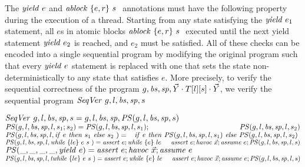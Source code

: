 The $\mathit{yield}\ e$ and $\mathit{ablock}\ {\{e,r\}}\ {s}\ $ annotations must have the following property during the execution of a thread. Starting from any state satisfying the $\mathit{yield}\ e_1$ statement, all $e$s in atomic blocks $\mathit{ablock}\ {\{e,r\}}\ {s}\ $ executed until the next yield statement $\mathit{yield}\ e_2$ is reached, and $e_2$ must be satisfied. All of these checks can be encoded into a single sequential program by modifying the original program such that every $\mathit{yield}\ e$ statement is replaced with one that sets the state non-deterministically to any state that satisfies $e$. More precisely, to verify the sequential correctness of the program $g, \mathit{bs}, \mathit{sp}, \vec{Y} \cdot T[l][s] \cdot \vec{Y}$, we verify the sequential program ${\mathit{SeqVer}\ } g, l, \mathit{bs}, \mathit{sp}, s$

\noindent
${\mathit{SeqVer}\ } g, l, \mathit{bs}, \mathit{sp}, s = g, l, \mathit{bs}, \mathit{sp},
                                                                         \mathit{PS}(g, l, \mathit{bs}, \mathit{sp},s)$\\
$\SeqProcStmt(\varsG, \varsL, \bodies, \specs, l, s_1; s_2) =  \SeqProcStmt(\varsG, \varsL, \bodies, \specs, l, s_1); \\
                                                                                      \hspace*{4.3cm}   \SeqProcStmt(\varsG, \varsL, \bodies, \specs, l, s_2)$\\
$\mathit{PS}(g, l, \mathit{bs}, \mathit{sp}, l, {\mathit{if}\ {e}\ }{\mathit{then}\ {s_1}\ }{\mathit{else}\ { s_2}\ }) =  \\
\hspace*{0.3cm} {\mathit{if}\ {e}\ }{\mathit{then}\ {\mathit{PS}(g, l, \mathit{bs}, \mathit{sp}, l, s_1)}\ }{\mathit{else}\ {\mathit{PS}(g, l, \mathit{bs}, \mathit{sp}, l, s_2)}\ }$\\
$\mathit{PS}(g, l, \mathit{bs}, \mathit{sp}, l, \mathit{while}\ \{{le}\}\ {{e}\ } {{s}\ }) =  \\
\mathit{assert}\ e; \\
\mathit{while}\ \{{e}\}\ {{le}\ } {{}\ }
 \hspace*{0.3cm}{\mathit{assert}\ e; \mathit{havoc}\ \vec{x}; \mathit{assume}\ e; \mathit{PS}(g, l, \mathit{bs}, \mathit{sp}, l, s)}$\\
$\mathit{PS}(\_, \_, \_, \_, \mathit{yield}\ e) =  \mathit{assert}\ e; \mathit{havoc}\ \vec{x}; \mathit{assume}\ e$\\
$\mathit{PS}(g, l, \mathit{bs}, \mathit{sp}, l, \mathit{twhile}\ \{{le}\}\ {{e}\ } {{s}\ }) =  \\
\mathit{assert}\ e; \\
\mathit{while}\ \{{e}\}\ {{le}\ } {{}\ }
 \hspace*{0.3cm}{\mathit{assert}\ e; \mathit{havoc}\ \vec{x}; \mathit{assume}\ e; \mathit{PS}(g, l, \mathit{bs}, \mathit{sp}, l, s)}$\\

